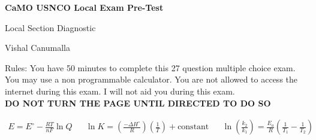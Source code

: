 \documentclass[11pt, leqno]{article}
\begin{document}
\begin{center} \LARGE \textbf{CaMO USNCO Local Exam Pre-Test} \end{center}
\begin{center}
    Local Section Diagnostic
\end{center}
\begin{center} Vishal Canumalla \end{center}


 \noindent Rules: You have 50 minutes to complete this 27 question multiple choice exam. You may use a non programmable calculator. You are not allowed to access the internet during this exam. I will not aid you during this exam. \\
 
 \centering\textbf{DO NOT TURN THE PAGE UNTIL DIRECTED TO DO SO}

\begin{center}

    \begin{align*}
        E = E^{\circ} - \frac{RT}{nF}\ln{Q} && \ln{K} = \left(\frac{-\Delta{H^{\circ}}}{R}\right)\left(\frac{1}{T}\right) + \text{constant} && \ln \left({\frac{k_2}{k_1}}\right) = \frac{E_a}{R}\left(\frac{1}{T_1} - \frac{1}{T_2}\right)
    \end{align*}
    

\end{center}
\end{document}
